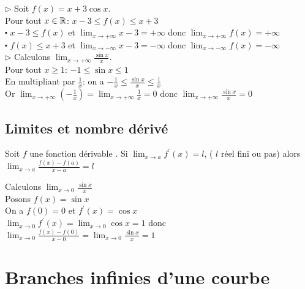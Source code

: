 \begin{example}
$\triangleright $ Soit $ f(x)= x+ 3\cos x $.\\
Pour tout $x\in\mathbb{R}$: \quad $ x-3\leq f(x)\leq x+3 $ \\
$ \centerdot $ $ x-3\leq f(x)$ et $\displaystyle \lim_{x \to +\infty}x-3=+\infty  $ donc $ \displaystyle \lim_{x \to +\infty}f(x)=+\infty $\\
$ \centerdot $ $  f(x)\leq x+3$ et $\displaystyle \lim_{x \to -\infty}x-3=-\infty  $ donc $ \displaystyle \lim_{x \to -\infty}f(x)=-\infty $ \\

$ \triangleright $ Calculons $\displaystyle\lim_{x \to +\infty}\frac{\sin x}{x} $.\\

Pour tout $ x\geq 1 $: $ -1\leq\sin x \leq 1 $ \\
En multipliant par $ \frac{1}{x} $: on a $ -\frac{1}{x}\leq \frac{\sin x}{x} \leq\frac{1}{x} $\\
Or $\displaystyle\lim_{x \to +\infty}(-\frac{1}{x})= \displaystyle\lim_{x \to +\infty}\frac{1}{x}=0$ donc $\displaystyle\lim_{x \to +\infty}\frac{\sin x}{x}=0 $
\end{example}


\subsection{Limites et nombre dérivé}

\begin{theorem}
Soit $ f $ une fonction dérivable .
Si $\displaystyle \lim_{x \to a}f^{'}(x)=l$,\;  ( $l$ réel fini ou pas) alors $\displaystyle\lim_{x \to a} \frac{f(x)-f(a)}{x-a}=l$
\end{theorem}

\begin{example}
Calculons $\displaystyle\lim_{x \to 0}\frac{\sin x}{x} $\\

Posons $ f(x)=\sin x $\\
On a $ f(0)=0 $ et  $ f^{'}(x)=\cos x$\\
 $ \displaystyle\lim_{x \to 0}f^{'}(x)=\lim_{x \to 0}\cos x=1 $ donc $\displaystyle \lim_{x \to 0} \frac{f(x)-f(0)}{x-0}=\displaystyle \lim_{x \to 0}\frac{\sin x}{x}=1$
\end{example}

\section{Branches infinies d'une courbe}


